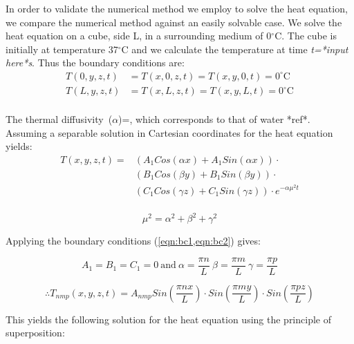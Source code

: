 In order to validate the numerical method we employ to solve the heat equation, we compare the numerical method against an easily solvable case. We solve the heat equation on a cube, side L, in a surrounding medium of 0$^{\circ}$C. The cube is initially at temperature 37$^{\circ}$C and we calculate the temperature at time \textit{t=*input here*s}. Thus the boundary conditions are:\\

\begin{align}
T(0,y,z,t)&=T(x,0,z,t)=T(x,y,0,t)=0^{\circ}\text{C} \label{eqn:bc1}\\
T(L,y,z,t)&=T(x,L,z,t)=T(x,y,L,t)=0^{\circ}\text{C} \label{eqn:bc2}\\
\end{align}

The thermal diffusivity~($\alpha$)=, which corresponds to that of water *ref*.\\


Assuming a separable solution in Cartesian coordinates for the heat equation yields:
\begin{equation}
\begin{split}
T(x,y,z,t)=&(A_1Cos(\alpha x) + A_1Sin(\alpha x))\cdot\\
&(B_1Cos(\beta y) + B_1Sin(\beta y))\cdot\\
&(C_1Cos(\gamma z) + C_1Sin(\gamma z))\cdot e^{-\alpha\mu^2t}\\
\end{split} 
\end{equation}

\begin{equation}
\mu^2=\alpha^2+\beta^2+\gamma^2
\end{equation}

Applying the boundary conditions (\cref{eqn:bc1,eqn:bc2}) gives:

\begin{equation}
A_1=B_1=C_1=0\
\text{and}\ \alpha=\frac{\pi n}{L}\ \beta=\frac{\pi m}{L}\ \gamma=\frac{\pi p}{L}
\end{equation}

\begin{equation}
\therefore  T_{nmp}(x,y,z,t)=A_{nmp}Sin\left(\frac{\pi n x}{L}\right)\cdot Sin\left(\frac{\pi m y}{L}\right)\cdot Sin\left(\frac{\pi p z}{L}\right)
\end{equation}

This yields the following solution for the heat equation using the principle of superposition:

